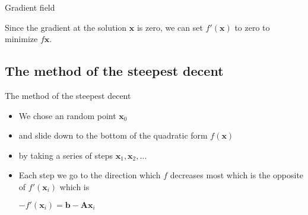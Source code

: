 \documentclass[\classoption]{beamer}
\begin{document}
\begin{frame}[fragile]{Gradient field}

\vspace{-0.25cm}
\begin{center}
\end{center}
\vspace{-0.25cm}
Since the gradient at the solution $\mathbf{x}$ is zero, we can set $f'(\mathbf{x})$ to zero to minimize $f\mathbf{x}$.

\end{frame}

\subsection{The method of the steepest decent}

\begin{frame}{The method of the steepest decent}

\begin{itemize}
\item We chose an random point $\mathbf{x}_0$
\item and slide down to the bottom of the quadratic form $f(\mathbf{x})$
\item by taking a series of steps $\mathbf{x}_1,\mathbf{x}_2,\ldots$
\item Each step we go to the direction which $f$ decreases most which is the opposite of $f'(\mathbf{x}_i)$ which is
\begin{center}
$-f'(\mathbf{x}_i)= \mathbf{b}-\mathbf{A}\mathbf{x}_i$
\end{center}
\end{itemize}

\end{frame}
\end{document}
